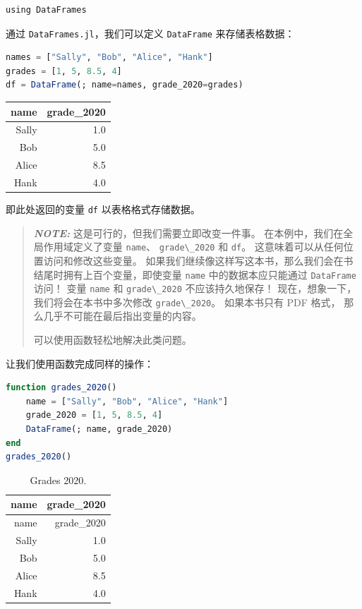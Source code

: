 \documentclass[
  notoc %
]{tufte-book}
\newcommand{\passthrough}[1]{#1}
\begin{document}
\begin{lstlisting}
using DataFrames
\end{lstlisting}

通过 \passthrough{\lstinline!DataFrames.jl!}，我们可以定义
\passthrough{\lstinline!DataFrame!} 来存储表格数据：

\begin{lstlisting}[language=Julia]
names = ["Sally", "Bob", "Alice", "Hank"]
grades = [1, 5, 8.5, 4]
df = DataFrame(; name=names, grade_2020=grades)
\end{lstlisting}

\begin{longtable}[]{@{}rr@{}}
\toprule
name & grade\_2020 \\
\midrule
\endhead
Sally & 1.0 \\
Bob & 5.0 \\
Alice & 8.5 \\
Hank & 4.0 \\
\bottomrule
\end{longtable}

即此处返回的变量 \passthrough{\lstinline!df!} 以表格格式存储数据。

\begin{quote}
\textbf{\emph{NOTE:}} 这是可行的，但我们需要立即改变一件事。
在本例中，我们在全局作用域定义了变量 \passthrough{\lstinline!name!}、
\passthrough{\lstinline!grade\_2020!} 和 \passthrough{\lstinline!df!}。
这意味着可以从任何位置访问和修改这些变量。
如果我们继续像这样写这本书，那么我们会在书结尾时拥有上百个变量，即使变量
\passthrough{\lstinline!name!} 中的数据本应只能通过
\passthrough{\lstinline!DataFrame!} 访问！ 变量
\passthrough{\lstinline!name!} 和 \passthrough{\lstinline!grade\_2020!}
不应该持久地保存！ 现在，想象一下，我们将会在本书中多次修改
\passthrough{\lstinline!grade\_2020!}。 如果本书只有 PDF 格式，
那么几乎不可能在最后指出变量的内容。

可以使用函数轻松地解决此类问题。
\end{quote}

让我们使用函数完成同样的操作：

\begin{lstlisting}[language=Julia]
function grades_2020()
    name = ["Sally", "Bob", "Alice", "Hank"]
    grade_2020 = [1, 5, 8.5, 4]
    DataFrame(; name, grade_2020)
end
grades_2020()
\end{lstlisting}

\hypertarget{tbl:grades_2020}{}
\begin{longtable}[]{@{}rr@{}}
\caption{\label{tbl:grades_2020}Grades 2020.}\tabularnewline
\toprule
name & grade\_2020 \\
\midrule
\endfirsthead
\toprule
name & grade\_2020 \\
\midrule
\endhead
Sally & 1.0 \\
Bob & 5.0 \\
Alice & 8.5 \\
Hank & 4.0 \\
\bottomrule
\end{longtable}
\end{document}

